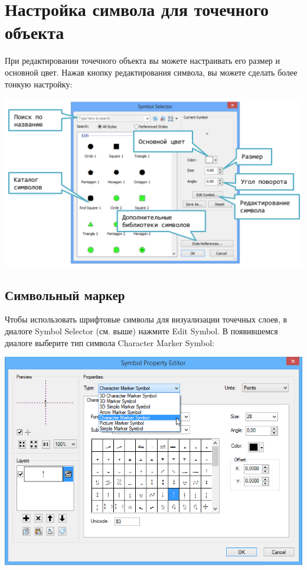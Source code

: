 \documentclass[12pt,]{book}
\begin{document}
\hypertarget{manual-vector-point}{%
\section{Настройка символа для точечного объекта}\label{manual-vector-point}}

При редактировании точечного объекта вы можете настраивать его размер и основной цвет. Нажав кнопку редактирования символа, вы можете сделать более тонкую настройку:

\includegraphics{images/Appendix/image25.png}

\hypertarget{manual-vector-symbol}{%
\subsection{Символьный маркер}\label{manual-vector-symbol}}

Чтобы использовать шрифтовые символы для визуализации точечных слоев, в диалоге Symbol Selector (см. выше) нажмите Edit Symbol. В появившемся диалоге выберите тип символа Character Marker Symbol:

\includegraphics{images/Appendix/image26.png}
\end{document}
